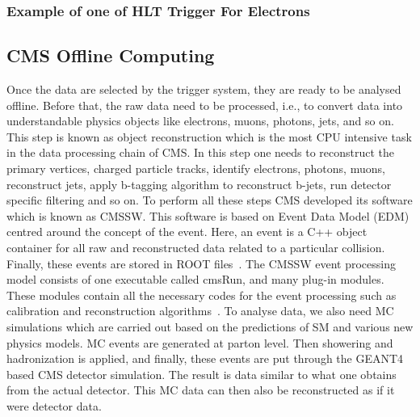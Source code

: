 \subsubsection{Example of one of HLT Trigger For Electrons} %
\label{ssub:example_of_one_of_hlt_trigger_for_electrons}



\subsection{CMS Offline Computing} %
\label{sub:cms_offline_computing}
Once the data are selected by the trigger system, they are ready to be analysed offline. Before that, the raw data need to be processed, i.e., to convert data into understandable physics objects like electrons, muons, photons, jets, and so on. This step is known as object reconstruction which is the most CPU intensive task in the data processing chain of CMS. In this step one needs to reconstruct the primary vertices, charged particle tracks, identify electrons, photons, muons, reconstruct jets, apply b-tagging algorithm to reconstruct b-jets, run detector specific filtering and so on.
To perform all these steps CMS developed its software which is known as CMSSW. This software is based on Event Data Model (EDM) centred around the concept of the event. Here, an event is a C++ object container for all raw and reconstructed data related to a particular collision. Finally, these events are stored in ROOT files~\cite{Root1996}. The CMSSW event processing model consists of one executable called cmsRun, and many plug-in modules. These modules contain all the necessary codes for the event processing such as calibration and reconstruction algorithms~\cite{Bayatyan2005}.
To analyse data, we also need MC simulations which are carried out based on the predictions of SM and various new physics models. MC events are generated at parton level. Then showering and hadronization is applied, and finally, these events are put through the GEANT4~\cite{Agostinelli2003} based CMS detector simulation. The result is data similar to what one obtains from the actual detector. This MC data can then also be reconstructed as if it were  detector data.


